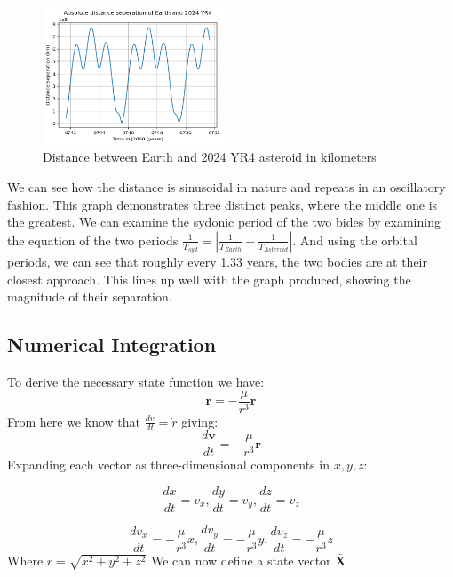 \documentclass[12pt,twocolumn]{article}  %
\begin{document}
\begin{figure}[H]
    \centering
    \includegraphics[width=0.48\textwidth]{Images/115-dis.png}
    \caption{Distance between Earth and 2024 YR4 asteroid in kilometers}
\end{figure}

\noindent We can see how the distance is sinusoidal in nature and repeats in an oscillatory fashion. 
This graph demonstrates three distinct peaks, where the middle one is the greatest. We can examine the sydonic period of 
the two bides by examining the equation of the two periods $\frac{1}{T_{syd}} = |\frac{1}{T_{Earth}} - \frac{1}{T_{Asteroid}}|$. And using the orbital periods,
we can see that roughly every 1.33 years, the two bodies are at their closest approach. This lines up well with the graph produced,
showing the magnitude of their separation. 


\subsection{Numerical Integration}
To derive the necessary state function we have:
\setcounter{equation}{0}
\begin{equation}
    \ddot{\mathbf{r}} = -\frac{\mu}{r^3} \mathbf{r}
\end{equation}
From here we know that $\frac{dv}{dt} = \dot{r}$ giving:
\begin{equation}
    \frac{d\mathbf{v}}{dt} = -\frac{\mu}{r^3} \mathbf{r}
\end{equation}
Expanding each vector as three-dimensional components in $x,y,z$:

\begin{equation}
    \frac{dx}{dt} = v_{x},  \frac{dy}{dt} = v_{y},   \frac{dz}{dt} = v_{z}
\end{equation}


\begin{equation}
    \frac{dv_{x}}{dt} = -\frac{\mu}{r^3} x, \frac{dv_{y}}{dt} = -\frac{\mu}{r^3} y, \frac{dv_{z}}{dt} = -\frac{\mu}{r^3} z
\end{equation}
Where $r = \sqrt{x^{2} + y^{2} + z^{2}}$
\newline
We can now define a state vector $\mathbf{\bar{X}}$
\end{document}
